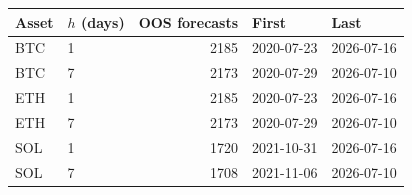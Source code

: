 \begin{tabular}{llrll}
\toprule
Asset & $h$ (days) & OOS forecasts & First & Last \\
\midrule
BTC & 1 & 2185 & 2020-07-23 & 2026-07-16 \\
BTC & 7 & 2173 & 2020-07-29 & 2026-07-10 \\
ETH & 1 & 2185 & 2020-07-23 & 2026-07-16 \\
ETH & 7 & 2173 & 2020-07-29 & 2026-07-10 \\
SOL & 1 & 1720 & 2021-10-31 & 2026-07-16 \\
SOL & 7 & 1708 & 2021-11-06 & 2026-07-10 \\
\bottomrule
\end{tabular}
